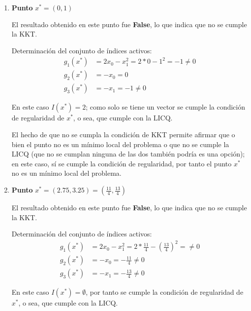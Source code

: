 \documentclass[titlepage, 11pt]{scrartcl}
\begin{document}
\begin{enumerate}
\begin{enumerate}
\begin{enumerate}
			El hecho de que no se cumpla la condición de KKT permite afirmar que o bien el punto no es un m\'inimo local del problema o que no se cumple la LICQ (que no se cumplan ninguna de las dos también podría es una opci\'on); en este caso, s\'i se cumple la condici\'on de regularidad, por tanto el punto $x^*$ no es un m\'inimo local del problema.
			
			\vspace{7mm}
			\item \textbf{Punto} $x^* = (0, 1)$
			
			El resultado obtenido en este punto fue \textbf{False}, lo que indica que no se cumple la KKT.
			
			Determinaci\'on del conjunto de \'indices activos:
			\begin{align*}
			g_1(x^*) &= 2x_0 - x_1^2 = 2 * 0 - 1^2 = -1 \neq 0\\
			g_2(x^*) &= -x_0 = 0\\
			g_3(x^*) &= -x_1 = -1 \neq 0
			\end{align*}
			
			En este caso $I(x^*)  = {2}$; como solo se tiene un vector se cumple la condici\'on de regularidad de $x^*$, o sea, que cumple con la LICQ.
			
			El hecho de que no se cumpla la condición de KKT permite afirmar que o bien el punto no es un m\'inimo local del problema o que no se cumple la LICQ (que no se cumplan ninguna de las dos también podría es una opci\'on); en este caso, s\'i se cumple la condici\'on de regularidad, por tanto el punto $x^*$ no es un m\'inimo local del problema.
			
			\vspace{7mm}
			\item \textbf{Punto} $x^* = (2.75, 3.25) = (\frac{11}{4}, \frac{13}{4})$
			
			El resultado obtenido en este punto fue \textbf{False}, lo que indica que no se cumple la KKT.
			
			Determinaci\'on del conjunto de \'indices activos:
			\begin{align*}
			g_1(x^*) &= 2x_0 - x_1^2 = 2 * \frac{11}{4} - (\frac{13}{4})^2 = \neq 0\\
			g_2(x^*) &= -x_0 = -\frac{11}{4} \neq 0\\
			g_3(x^*) &= -x_1 = -\frac{13}{4} \neq 0
			\end{align*}
			
			En este caso $I(x^*)  = \emptyset$, por tanto se cumple la condici\'on de regularidad de $x^*$, o sea, que cumple con la LICQ.
			

\end{enumerate}
\end{enumerate}
\end{enumerate}
\end{document}
